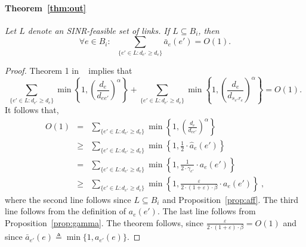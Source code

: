 \documentclass[11pt]{article}
\newenvironment{proof sketch}{\noindent {\bf Proof sketch:} }{\hfill \qed}
\newcommand{\eps}{\varepsilon}
\newcommand{\eqdf}{\triangleq}
\begin{document}
\paragraph{Theorem~\ref{thm:out}}
    \textit{Let $L$ denote an SINR-feasible set of links. If $L \subseteq
  B_i$, then
     \[
\forall e\in B_i:~~~           \sum_{\{e' \in L : d_{e'} \geq d_{e}\}}\bar a _{e}(e') = O(1).
     \]}
\begin{proof}
    Theorem 1 in ~\cite{K10} implies that
    $$\sum_{\{e' \in L : d_{e'} \geq d_{e}\}}\min\left\{1,\left(\frac{d_e}{d_{ee'}}\right)^{\alpha}\right\}
        +\sum_{\{e' \in L : d_{e'} \geq d_{e}\}}
    \min \left\{1,\left ( \frac{d_e}{d_{s_{e'}r_e}}\right)^{\alpha}\right\} = O(1).$$
    It follows that,
    \begin{eqnarray*}
        O(1) & = & \sum_{\{e' \in L : d_{e'} \geq d_{e}\}}\min\left\{1,\left(\frac{d_e}{d_{ee'}}\right)^{\alpha}\right\} \\
        & \geq & \sum_{\{e' \in L : d_{e'} \geq d_{e}\}}\min\left\{1,\frac 12 \cdot{\hat a}_{e}(e')\right\} \\
        & = & \sum_{\{e' \in L : d_{e'} \geq d_{e}\}}\min\left\{1,\frac {1}{2\cdot \gamma_{e'}} \cdot a_{e}(e')\right\} \\
        & \geq & \sum_{\{e' \in L : d_{e'} \geq d_{e}\}}\min\left\{1,\frac {\eps}{2\cdot (1+\eps) \cdot \beta} \cdot a_{e}(e')\right\}\:,
    \end{eqnarray*}
    where the second line follows since $L \subseteq B_i$ and Proposition~\ref{prop:aff}. The third line follows from the definition of $a_e(e')$. The last line follows from Proposition~\ref{prop:gamma}.
    The theorem follows, since $\frac {\eps}{2\cdot (1+\eps) \cdot \beta} = O(1)$ and since $\bar a_{e'}(e)\eqdf \min\{1,a_{e'}(e)\}$.
\end{proof}
\end{document}
